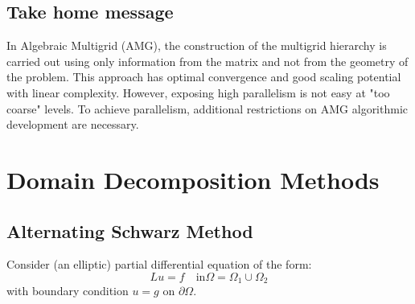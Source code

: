 \documentclass[11pt]{book}
\begin{document}
\section*{Take home message}
   In Algebraic Multigrid (AMG), the construction of the multigrid hierarchy is carried out using only information from the matrix and not from the geometry of the problem. This approach has optimal convergence and good scaling potential with linear complexity. However, exposing high parallelism is not easy at "too coarse" levels. To achieve parallelism, additional restrictions on AMG algorithmic development are necessary. 
\chapter{Domain Decomposition Methods}
\section*{Alternating Schwarz Method}
Consider (an elliptic) partial differential equation of the form:
$$ L u=f \quad \text{in} \Omega=\Omega_{1} \cup \Omega_{2} $$
with boundary condition $u=g$ on $\partial \Omega$.
\end{document}
